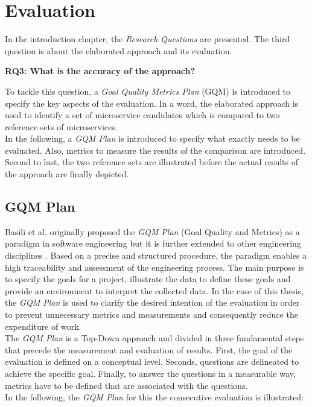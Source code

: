 \chapter{Evaluation}
\label{ch:Evalutation}
In the introduction chapter, the \textit{Research Questions} are presented. The third question is about the elaborated approach and its evaluation.



\vspace{0.5cm}
\par
\begingroup
\leftskip=1cm
\rightskip=1cm

\noindent
\textbf{RQ3: What is the accuracy of the approach? }

\endgroup
\vspace{0.5cm}

\noindent
To tackle this question, a \textit{Goal Quality Metrics Plan } (GQM) is introduced to specify the key aspects of the evaluation. In a word, the elaborated approach is used to identify a set of microservice candidates which is compared to two reference sets of microservices. \\
In the following, a \textit{GQM Plan} is introduced to specify what exactly needs to be evaluated. Also, metrics to measure the results of the comparison are introduced. Second to last, the two reference sets are illustrated before the actual results of the approach are finally depicted.




\section{GQM Plan}
\label{sec:Evaluation:GQM}
Basili et al. originally proposed the \textit{GQM Plan} (Goal Quality and Metrics) as a paradigm in software engineering but it is further extended to other engineering disciplines \cite{BasiliGQM}. Based on a precise and structured procedure, the paradigm enables a high traceability and 
assessment of the engineering process. The main purpose is to specify the goals for a project, illustrate the data to define these goals and provide an environment to interpret the collected data. In the case of this thesis, the \textit{GQM Plan} is used to clarify the desired intention of the evaluation in order to prevent unnecessary metrics and measurements and consequently reduce the expenditure of work. \\
The \textit{GQM Plan} is a Top-Down approach and divided in three fundamental steps that precede the measurement and evaluation of results. First, the goal of the evaluation is defined on a conceptual level. Seconds, questions are delineated to achieve the specific goal. Finally, to answer the questions in a measurable way, metrics have to be defined that are associated with the questions. \\
In the following, the \textit{GQM Plan} for this the consecutive evaluation is illustrated:

